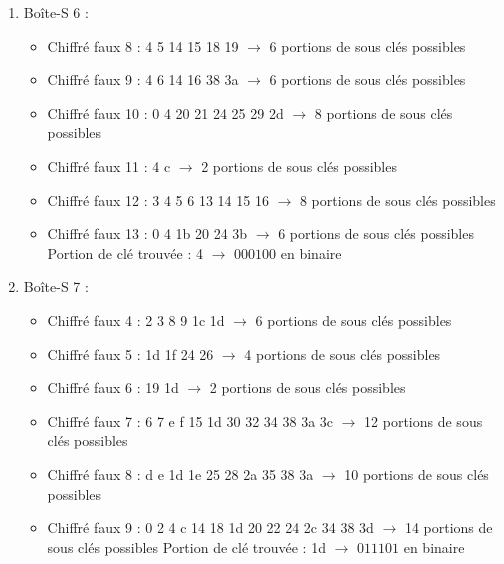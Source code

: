 \documentclass[11pt]{article}
\begin{document}
\begin{enumerate}
\item Boîte-S 6 : 
\begin{itemize}
	\item Chiffré faux 8 : 4 5 14 15 18 19 $\longrightarrow$ 6 portions de sous clés possibles
	\item Chiffré faux 9 : 4 6 14 16 38 3a $\longrightarrow$ 6 portions de sous clés possibles
	\item Chiffré faux 10 : 0 4 20 21 24 25 29 2d $\longrightarrow$ 8 portions de sous clés possibles
	\item Chiffré faux 11 : 4 c $\longrightarrow$ 2 portions de sous clés possibles
	\item Chiffré faux 12 : 3 4 5 6 13 14 15 16 $\longrightarrow$ 8 portions de sous clés possibles
	\item Chiffré faux 13 : 0 4 1b 20 24 3b $\longrightarrow$ 6 portions de sous clés possibles \newline
	Portion de clé trouvée : 4 $\longrightarrow$ $000100$ en binaire
\end{itemize}

\item Boîte-S 7 : 
\begin{itemize}
	\item Chiffré faux 4 : 2 3 8 9 1c 1d $\longrightarrow$ 6 portions de sous clés possibles
	\item Chiffré faux 5 : 1d 1f 24 26 $\longrightarrow$ 4 portions de sous clés possibles
	\item Chiffré faux 6 : 19 1d $\longrightarrow$ 2 portions de sous clés possibles
	\item Chiffré faux 7 : 6 7 e f 15 1d 30 32 34 38 3a 3c $\longrightarrow$ 12 portions de sous clés possibles
	\item Chiffré faux 8 : d e 1d 1e 25 28 2a 35 38 3a $\longrightarrow$ 10 portions de sous clés possibles
	\item Chiffré faux 9 : 0 2 4 c 14 18 1d 20 22 24 2c 34 38 3d $\longrightarrow$ 14 portions de sous clés possibles \newline
	Portion de clé trouvée : 1d $\longrightarrow$ $011101$ en binaire
\end{itemize}


\end{enumerate}
\end{document}

